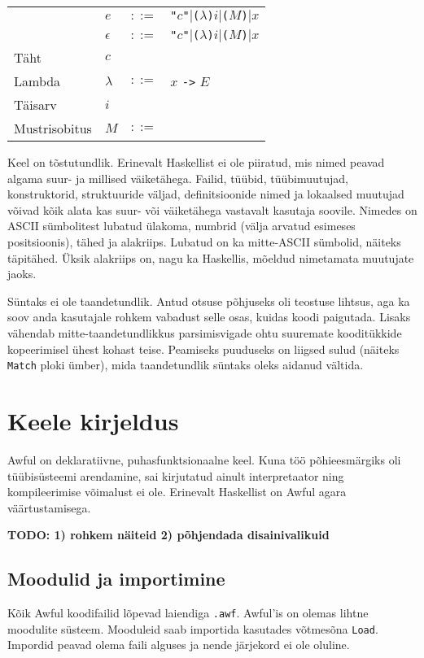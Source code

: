 \documentclass[12pt]{article}
\newcommand\peatykk[1]{
  \clearpage
  \section{#1}}
\newcommand\markus[1]{\textcolor{roheline}{\textbf{#1}}}
\begin{document}
\begin{tabular}{llll}
         & $e$ & $::=$ & {\color{hall}\verb!"!}$c${\color{hall}\verb!"!}$|${\color{hall}\verb!(!}$\lambda${\color{hall}\verb!)!}$i|${\color{hall}\verb!(!}$M${\color{hall}\verb!)!}$|x$ \\
         & $\epsilon$ & $::=$ & {\color{hall}\verb!"!}$c${\color{hall}\verb!"!}$|${\color{hall}\verb!(!}$\lambda${\color{hall}\verb!)!}$i|${\color{hall}\verb!(!}$M${\color{hall}\verb!)!}$|x$ \\
      Täht & $c$ &  &  \\
      Lambda & $\lambda$ & $::=$ & $x$ \verb!->! $E$ \\
      Täisarv & $i$ &  &  \\
      Mustrisobitus & $M$ & $::=$ &  \\
    \end{tabular}

    Keel on tõstutundlik. Erinevalt Haskellist ei ole piiratud, mis nimed peavad algama suur- ja millised väiketähega. Failid, tüübid, tüübimuutujad, konstruktorid, struktuuride väljad, definitsioonide nimed ja lokaalsed muutujad võivad kõik alata kas suur- või väiketähega vastavalt kasutaja soovile. Nimedes on ASCII sümbolitest lubatud ülakoma, numbrid (välja arvatud esimeses positsioonis), tähed ja alakriips. Lubatud on ka mitte-ASCII sümbolid, näiteks täpitähed. Üksik alakriips on, nagu ka Haskellis, mõeldud nimetamata muutujate jaoks.

    Süntaks ei ole taandetundlik. Antud otsuse põhjuseks oli teostuse lihtsus, aga ka soov anda kasutajale rohkem vabadust selle osas, kuidas koodi paigutada. Lisaks vähendab mitte-taandetundlikkus parsimisvigade ohtu suuremate kooditükkide kopeerimisel ühest kohast teise. Peamiseks puuduseks on liigsed sulud (näiteks \verb!Match! ploki ümber), mida taandetundlik süntaks oleks aidanud vältida.
  \peatykk{Keele kirjeldus}\label{manual}
    Awful on deklaratiivne, puhasfunktsionaalne keel. Kuna töö põhieesmärgiks oli tüübisüsteemi arendamine, sai kirjutatud ainult interpretaator ning kompileerimise võimalust ei ole. Erinevalt Haskellist on Awful agara väärtustamisega.

    \markus{TODO: 1) rohkem näiteid 2) põhjendada disainivalikuid}
    \subsection{Moodulid ja importimine}
      Kõik Awful koodifailid lõpevad laiendiga \verb!.awf!. Awful'is on olemas lihtne moodulite süsteem. Mooduleid saab importida kasutades võtmesõna \verb!Load!. Impordid peavad olema faili alguses ja nende järjekord ei ole oluline.
\end{document}
